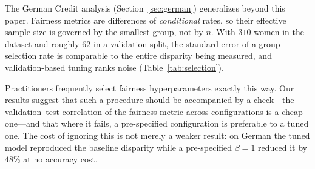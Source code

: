 The German Credit analysis (Section~\ref{sec:german}) generalizes beyond this
paper. Fairness metrics are differences of \emph{conditional} rates, so their
effective sample size is governed by the smallest group, not by $n$. With
$310$ women in the dataset and roughly $62$ in a validation split, the
standard error of a group selection rate is comparable to the entire disparity
being measured, and validation-based tuning ranks noise
(Table~\ref{tab:selection}).

Practitioners frequently select fairness hyperparameters exactly this way. Our
results suggest that such a procedure should be accompanied by a check---the
validation--test correlation of the fairness metric across configurations is a
cheap one---and that where it fails, a pre-specified configuration is
preferable to a tuned one. The cost of ignoring this is not merely a weaker
result: on German the tuned model reproduced the baseline disparity while a
pre-specified $\beta=1$ reduced it by $48\%$ at no accuracy cost.
